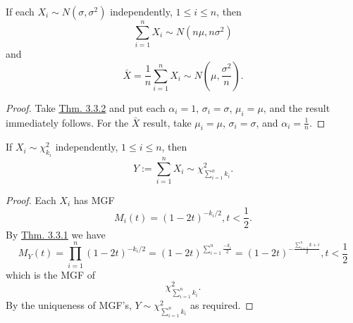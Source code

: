 \documentclass[11pt,fleqn]{book} %
\begin{document}
\begin{corollary} \label{cor:333}
If each \(X_i \sim N(\sigma, \sigma^2)\) independently, \(1 \leq i \leq n\), then
\[
\sum_{i=1}^n X_i \sim N(n\mu, n\sigma^2)
\]
and
\[
\bar{X} = \frac{1}{n}\sum_{i=1}^n X_i \sim N\left(\mu, \frac{\sigma^2}{n}\right).
\]
\end{corollary}
\begin{proof} Take \hyperref[thm:332]{Thm. 3.3.2} and put each \(\alpha_i = 1\), \(\sigma_i = \sigma\), \(\mu_i = \mu\), and the result immediately follows. For the \(\bar{X}\) result, take \(\mu_i = \mu\), \(\sigma_i = \sigma\), and \(\alpha_i = \frac1n\).
\end{proof}

\begin{proposition} \label{prop:334}
If \(X_i \sim \chi_{k_i}^2\) independently, \(1 \leq i \leq n\), then
\[
Y := \sum_{i=1}^n X_i \sim \chi^2_{\sum_{i=1}^n k_i}.
\]
\end{proposition}
\begin{proof} Each \(X_i\) has MGF
\[
M_i(t) = (1 - 2t)^{-k_i / 2}, t < \frac12.
\]
\indent By \hyperref[thm:331]{Thm. 3.3.1} we have
\[
M_Y(t) = \prod_{i=1}^n(1 - 2t)^{-k_i/2} = (1 - 2t)^{\sum_{i=1}^n \frac{-k_i}{2}} = (1 - 2t)^{-\frac{\sum_{i=1}^n k+i}{2}}, t < \frac12
\]
which is the MGF of
\[
\chi^2_{\sum_{i=1}^n k_i}.
\]
\indent By the uniqueness of MGF's, \(Y \sim \chi^2_{\sum_{i=1}^n k_i}\) as required.
\end{proof}
\end{document}
